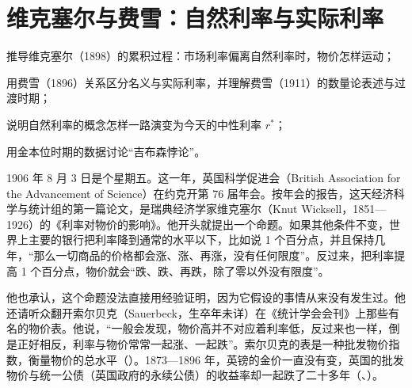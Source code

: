 \chapter{维克塞尔与费雪：自然利率与实际利率}\label{ch:wicksell}

\begin{chapterguide}
\begin{guidegoals}
\item 推导维克塞尔（1898）的累积过程：市场利率偏离自然利率时，物价怎样运动；
\item 用费雪（1896）关系区分名义与实际利率，并理解费雪（1911）的数量论表述与过渡时期；
\item 说明自然利率的概念怎样一路演变为今天的中性利率 $r^{*}$；
\item 用金本位时期的数据讨论“吉布森悖论”。
\end{guidegoals}
\end{chapterguide}

1906 年 8 月 3 日是个星期五。这一年，英国科学促进会（British Association for the Advancement of Science）在约克开第 76 届年会。按年会的报告，这天经济科学与统计组的第一篇论文，是瑞典经济学家维克塞尔（Knut Wicksell，1851—1926）的《利率对物价的影响》\cite{baas1907,wikisource2026}。他开头就提出一个命题。如果其他条件不变，世界上主要的银行把利率降到通常的水平以下，比如说 1 个百分点，并且保持几年，“那么一切商品的价格都会涨、涨、再涨，没有任何限度”\cite{wicksell1907}。反过来，把利率提高 1 个百分点，物价就会“跌、跌、再跌，除了零以外没有限度”\cite{wicksell1907}。

他也承认，这个命题没法直接用经验证明，因为它假设的事情从来没有发生过\cite{wicksell1907}。他还请听众翻开索尔贝克（Sauerbeck，生卒年未详）在《统计学会会刊》上那些有名的物价表。他说，“一般会发现，物价高并不对应着利率低，反过来也一样，倒是正好相反，利率与物价常常一起涨、一起跌”\cite{wicksell1907}。索尔贝克的表是一种批发物价指数，衡量物价的总水平（）。1873—1896 年，英镑的金价一直没有变，英国的批发物价与统一公债（英国政府的永续公债）的收益率却一起跌了二十多年（、）\cite{boe2017}。

